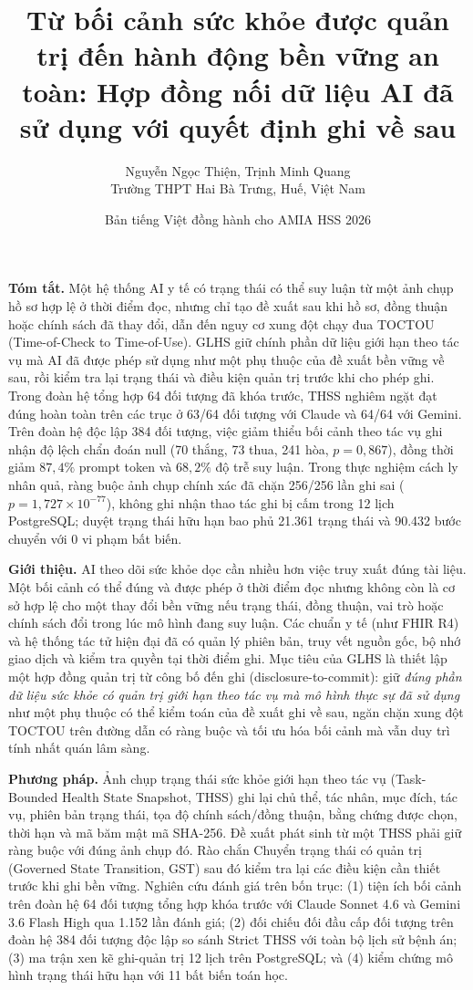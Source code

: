 \documentclass[10pt]{article}
\title{\textbf{Từ bối cảnh sức khỏe được quản trị đến hành động bền vững an toàn: Hợp đồng nối dữ liệu AI đã sử dụng với quyết định ghi về sau}}
\author{Nguyễn Ngọc Thiện, Trịnh Minh Quang \\ Trường THPT Hai Bà Trưng, Huế, Việt Nam}
\date{Bản tiếng Việt đồng hành cho AMIA HSS 2026}
\begin{document}
\maketitle

\textbf{Tóm tắt.} Một hệ thống AI y tế có trạng thái có thể suy luận từ một ảnh chụp hồ sơ hợp lệ ở thời điểm đọc, nhưng chỉ tạo đề xuất sau khi hồ sơ, đồng thuận hoặc chính sách đã thay đổi, dẫn đến nguy cơ xung đột chạy đua TOCTOU (Time-of-Check to Time-of-Use). GLHS giữ chính phần dữ liệu giới hạn theo tác vụ mà AI đã được phép sử dụng như một phụ thuộc của đề xuất bền vững về sau, rồi kiểm tra lại trạng thái và điều kiện quản trị trước khi cho phép ghi. Trong đoàn hệ tổng hợp 64 đối tượng đã khóa trước, THSS nghiêm ngặt đạt đúng hoàn toàn trên các trục ở 63/64 đối tượng với Claude và 64/64 với Gemini. Trên đoàn hệ độc lập 384 đối tượng, việc giảm thiểu bối cảnh theo tác vụ ghi nhận độ lệch chẩn đoán null (70 thắng, 73 thua, 241 hòa, $p = 0{,}867$), đồng thời giảm $87{,}4\%$ prompt token và $68{,}2\%$ độ trễ suy luận. Trong thực nghiệm cách ly nhân quả, ràng buộc ảnh chụp chính xác đã chặn 256/256 lần ghi sai ($p = 1{,}727 \times 10^{-77}$), không ghi nhận thao tác ghi bị cấm trong 12 lịch PostgreSQL; duyệt trạng thái hữu hạn bao phủ 21.361 trạng thái và 90.432 bước chuyển với 0 vi phạm bất biến.

\textbf{Giới thiệu.} AI theo dõi sức khỏe dọc cần nhiều hơn việc truy xuất đúng tài liệu. Một bối cảnh có thể đúng và được phép ở thời điểm đọc nhưng không còn là cơ sở hợp lệ cho một thay đổi bền vững nếu trạng thái, đồng thuận, vai trò hoặc chính sách đổi trong lúc mô hình đang suy luận. Các chuẩn y tế (như FHIR R4) và hệ thống tác tử hiện đại đã có quản lý phiên bản, truy vết nguồn gốc, bộ nhớ giao dịch và kiểm tra quyền tại thời điểm ghi. Mục tiêu của GLHS là thiết lập một hợp đồng quản trị từ công bố đến ghi (disclosure-to-commit): giữ \emph{đúng phần dữ liệu sức khỏe có quản trị giới hạn theo tác vụ mà mô hình thực sự đã sử dụng} như một phụ thuộc có thể kiểm toán của đề xuất ghi về sau, ngăn chặn xung đột TOCTOU trên đường dẫn có ràng buộc và tối ưu hóa bối cảnh mà vẫn duy trì tính nhất quán lâm sàng.

\textbf{Phương pháp.} Ảnh chụp trạng thái sức khỏe giới hạn theo tác vụ (Task-Bounded Health State Snapshot, THSS) ghi lại chủ thể, tác nhân, mục đích, tác vụ, phiên bản trạng thái, tọa độ chính sách/đồng thuận, bằng chứng được chọn, thời hạn và mã băm mật mã SHA-256. Đề xuất phát sinh từ một THSS phải giữ ràng buộc với đúng ảnh chụp đó. Rào chắn Chuyển trạng thái có quản trị (Governed State Transition, GST) sau đó kiểm tra lại các điều kiện cần thiết trước khi ghi bền vững. Nghiên cứu đánh giá trên bốn trục: (1) tiện ích bối cảnh trên đoàn hệ 64 đối tượng tổng hợp khóa trước với Claude Sonnet 4.6 và Gemini 3.6 Flash High qua 1.152 lần đánh giá; (2) đối chiếu đối đầu cấp đối tượng trên đoàn hệ 384 đối tượng độc lập so sánh Strict THSS với toàn bộ lịch sử bệnh án; (3) ma trận xen kẽ ghi-quản trị 12 lịch trên PostgreSQL; và (4) kiểm chứng mô hình trạng thái hữu hạn với 11 bất biến toán học.
\end{document}
